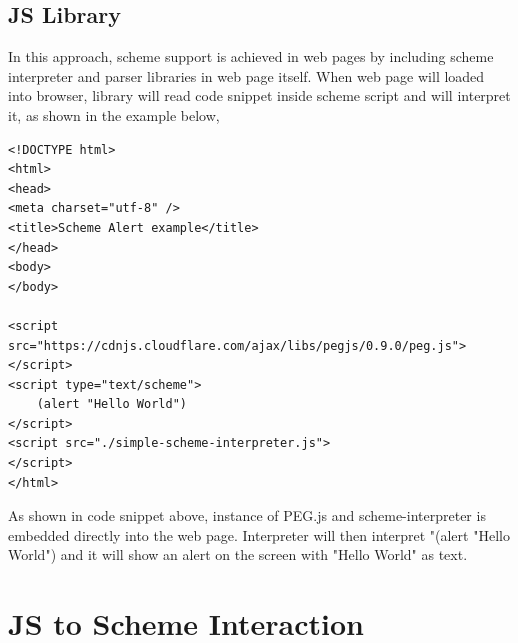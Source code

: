 \subsection{JS Library}


In this approach, scheme support is achieved in web pages by including scheme interpreter and parser libraries in web page itself. When web page will loaded into browser,  library will read code snippet inside scheme script and will interpret it, as shown in the example below, 


\begin{lstlisting}[frame=single]  
<!DOCTYPE html>
<html>
<head>
<meta charset="utf-8" />
<title>Scheme Alert example</title>
</head>
<body>
</body>

<script src="https://cdnjs.cloudflare.com/ajax/libs/pegjs/0.9.0/peg.js">
</script>
<script type="text/scheme">
	(alert "Hello World")
</script>
<script src="./simple-scheme-interpreter.js">
</script>
</html>
\end{lstlisting}

As shown in code snippet above,  instance of PEG.js and scheme-interpreter is embedded directly into the web page. Interpreter will then interpret "(alert "Hello World") and it will show an alert on the screen with "Hello World" as text.


\section{JS to Scheme Interaction}

